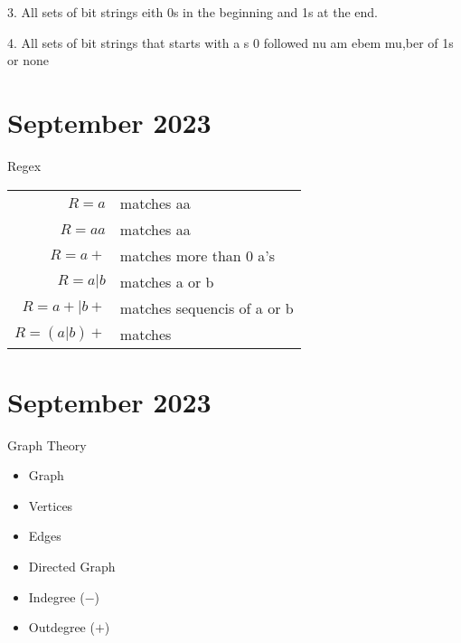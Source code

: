 \documentclass{article}
\let\stdsection\section
\renewcommand\section{\newpage\stdsection}
\begin{document}
3. All sets of bit strings eith 0s in the beginning and 1s at the end.

4. All sets of bit strings that starts with a s 0 followed nu am ebem mu,ber of 1s or none


\section{ September 2023}

Regex
\begin{tabular}{rl}
  $R = a$ & matches aa\\
  $R = aa$ & matches aa\\
  $R = a+$ & matches more than 0 a's\\
  $R = a | b$ & matches a or b\\
  $R = a+|b+$ & matches sequencis of a or b\\
  $R = (a|b)+$ & matches 
\end{tabular}

\section{ September 2023}

Graph Theory

\begin{itemize}
  \item Graph
  \item Vertices
  \item Edges
  \item Directed Graph
  \item Indegree ($-$)
  \item Outdegree ($+$)
\end{itemize}
\end{document}
